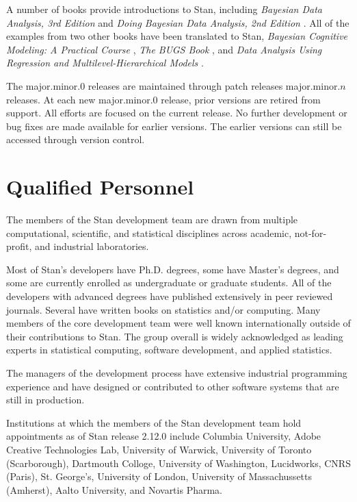 A number of books provide introductions to Stan, including {\it
  Bayesian Data Analysis, 3rd Edition} \citep{GelmanEtAl:2013} and
{\it Doing Bayesian Data Analysis, 2nd Edition} \citep{Kruschke:2014}.
All of the examples from two other books have been translated to
Stan, {\it Bayesian Cognitive Modeling: A Practical Course}
\citep{LeeWagenmakers:2013}, {\it The BUGS Book}
\citep{LunnEtAl:2012}, and {\it Data Analysis Using Regression and
  Multilevel-Hierarchical Models} \citep{GelmanHill:2007}.

The major.minor.0 releases are maintained through patch releases
major.minor.$n$ releases.  At each new major.minor.0 release, prior
versions are retired from support.  All efforts are focused on the
current release.  No further development or bug fixes are made
available for earlier versions.  The earlier versions can still be
accessed through version control.


\section{Qualified Personnel}

The members of the Stan development team are drawn from multiple
computational, scientific, and statistical disciplines across
academic, not-for-profit, and industrial laboratories. 

Most of Stan's developers have Ph.D. degrees, some have Master's
degrees, and some are currently enrolled as undergraduate or graduate
students. All of the developers with advanced degrees have published
extensively in peer reviewed journals. Several have written books on
statistics and/or computing. Many members of the core development team
were well known internationally outside of their contributions to Stan.
The group overall is widely acknowledged as leading experts in
statistical computing, software development, and applied statistics.

The managers of the development process have extensive industrial
programming experience and have designed or contributed to other
software systems that are still in production.

Institutions at which the members of the Stan development team hold
appointments as of Stan release 2.12.0 include Columbia University,
Adobe Creative Technologies Lab, University of Warwick, University of
Toronto (Scarborough), Dartmouth Colloge, University of Washington,
Lucidworks, CNRS (Paris), St. George's, University of London,
University of Massachussetts (Amherst), Aalto University, and Novartis
Pharma.

